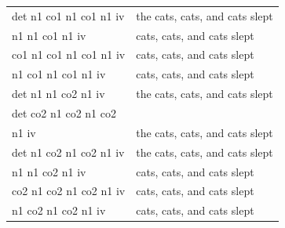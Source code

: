 \documentclass[11pt]{article}
\begin{document}
\begin{tabular}{ll}
det n1 co1 n1 co1 n1 iv & the cats, cats, and cats slept\\
n1 n1 co1 n1 iv & cats, cats, and cats slept\\
co1 n1 co1 n1 co1 n1 iv & cats, cats, and cats slept\\
n1 co1 n1 co1 n1 iv & cats, cats, and cats slept\\
det n1 n1 co2 n1 iv & the cats, cats, and cats slept\\
det co2 n1 co2 n1 co2 & \\
\phantom{...}n1 iv & the cats, cats, and cats slept\\
det n1 co2 n1 co2 n1 iv & the cats, cats, and cats slept\\
n1 n1 co2 n1 iv & cats, cats, and cats slept\\
co2 n1 co2 n1 co2 n1 iv & cats, cats, and cats slept\\
n1 co2 n1 co2 n1 iv & cats, cats, and cats slept\\
\end{tabular}




\end{document}
